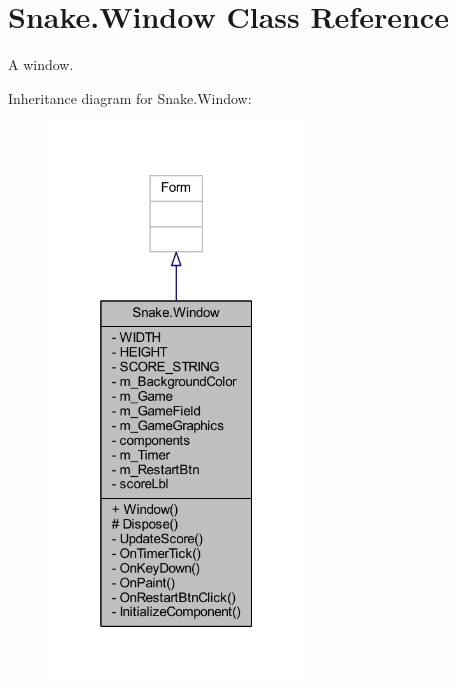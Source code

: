 \hypertarget{class_snake_1_1_window}{}\section{Snake.\+Window Class Reference}
\label{class_snake_1_1_window}


A window.  




Inheritance diagram for Snake.\+Window\+:
\nopagebreak
\begin{figure}[H]
\begin{center}
\leavevmode
\includegraphics[width=193pt]{d1/d02/class_snake_1_1_window__inherit__graph}
\end{center}
\end{figure}


